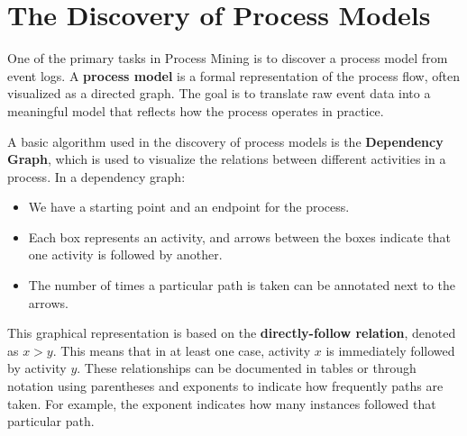    \section{The Discovery of Process Models}
    
    One of the primary tasks in Process Mining is to discover a process model from event logs. A \textbf{process model} is a formal representation of the process flow, often visualized as a directed graph. The goal is to translate raw event data into a meaningful model that reflects how the process operates in practice.
    
    A basic algorithm used in the discovery of process models is the \textbf{Dependency Graph}, which is used to visualize the relations between different activities in a process. In a dependency graph:
    \begin{itemize}
        \item We have a starting point and an endpoint for the process.
        \item Each box represents an activity, and arrows between the boxes indicate that one activity is followed by another.
        \item The number of times a particular path is taken can be annotated next to the arrows.
    \end{itemize}
    
    This graphical representation is based on the \textbf{directly-follow relation}, denoted as $x > y$. This means that in at least one case, activity $x$ is immediately followed by activity $y$. These relationships can be documented in tables or through notation using parentheses and exponents to indicate how frequently paths are taken. For example, the exponent indicates how many instances followed that particular path.
    
